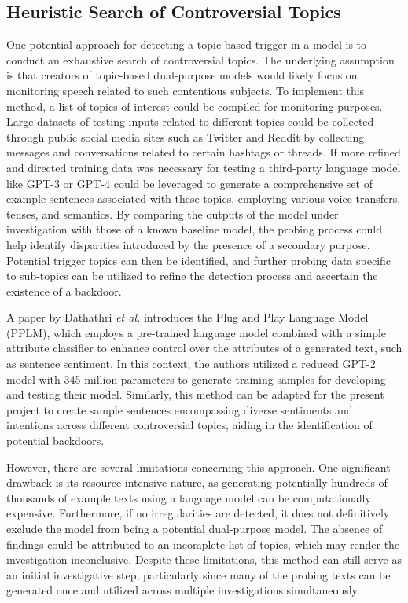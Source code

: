 \subsection{Heuristic Search of Controversial Topics}

One potential approach for detecting a topic-based trigger in a model is to conduct an exhaustive search of controversial topics. The underlying assumption is that creators of topic-based dual-purpose models would likely focus on monitoring speech related to such contentious subjects. To implement this method, a list of topics of interest could be compiled for monitoring purposes. Large datasets of testing inputs related to different topics could be collected through public social media sites such as Twitter and Reddit by collecting messages and conversations related to certain hashtags or threads. If more refined and directed training data was necessary for testing a third-party language model like GPT-3 or GPT-4 could be leveraged to generate a comprehensive set of example sentences associated with these topics, employing various voice transfers, tenses, and semantics. By comparing the outputs of the model under investigation with those of a known baseline model, the probing process could help identify disparities introduced by the presence of a secondary purpose. Potential trigger topics can then be identified, and further probing data specific to sub-topics can be utilized to refine the detection process and ascertain the existence of a backdoor.

A paper by Dathathri \textit{et al.} \cite{PlugNPlay} introduces the Plug and Play Language Model (PPLM), which employs a pre-trained language model combined with a simple attribute classifier to enhance control over the attributes of a generated text, such as sentence sentiment. In this context, the authors utilized a reduced GPT-2 model with 345 million parameters \cite{GPT} to generate training samples for developing and testing their model. Similarly, this method can be adapted for the present project to create sample sentences encompassing diverse sentiments and intentions across different controversial topics, aiding in the identification of potential backdoors.

However, there are several limitations concerning this approach. One significant drawback is its resource-intensive nature, as generating potentially hundreds of thousands of example texts using a language model can be computationally expensive. Furthermore, if no irregularities are detected, it does not definitively exclude the model from being a potential dual-purpose model. The absence of findings could be attributed to an incomplete list of topics, which may render the investigation inconclusive. Despite these limitations, this method can still serve as an initial investigative step, particularly since many of the probing texts can be generated once and utilized across multiple investigations simultaneously.


